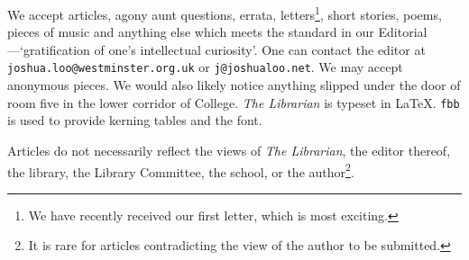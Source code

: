 \begin{multicols}{2}
We accept articles, agony aunt questions, errata, letters\footnote{We have recently received our first letter, which is most exciting.}, short stories, poems, pieces of music and anything else which meets the standard in our Editorial---`gratification of one's intellectual curiosity'. One can contact the editor at \texttt{joshua.loo@westminster.org.uk} or \texttt{j@joshualoo.net}. We may accept anonymous pieces. We would also likely notice anything slipped under the door of room five in the lower corridor of College. \textit{The Librarian} is typeset in \LaTeX{}. \texttt{fbb} is used to provide kerning tables and the font.

Articles do not necessarily reflect the views of \textit{The Librarian}, the editor thereof, the library, the Library Committee, the school, or the author\footnote{It is rare for articles contradicting the view of the author to be submitted.}.
	
\end{multicols}